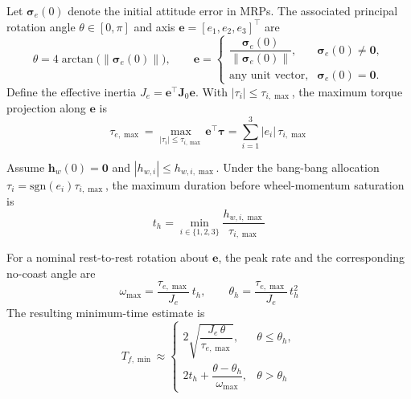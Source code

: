 \documentclass[journal]{new-aiaa}
\begin{document}
Let $\boldsymbol{\sigma}_e(0)$ denote the initial attitude error in MRPs. The associated principal rotation angle $\theta\in[0,\pi]$ and axis
$\boldsymbol{e}=[e_1,e_2,e_3]^\top$ are
\begin{equation}
\theta = 4\arctan\!\big(\|\boldsymbol{\sigma}_e(0)\|\big),\qquad
\boldsymbol{e} =
\begin{cases}
\dfrac{\boldsymbol{\sigma}_e(0)}{\|\boldsymbol{\sigma}_e(0)\|}, & \boldsymbol{\sigma}_e(0)\neq \boldsymbol{0},\\[6pt]
\text{any unit vector}, & \boldsymbol{\sigma}_e(0)=\boldsymbol{0}.
\end{cases}
\label{eq:app_axis_angle}
\end{equation}
Define the effective inertia $J_e = \boldsymbol{e}^\top\boldsymbol{J}_0\boldsymbol{e}$. With $|\tau_i|\le \tau_{i,\max}$, the maximum torque projection along $\boldsymbol{e}$ is
\begin{equation}
\tau_{e,\max}=\max_{|\tau_i|\le \tau_{i,\max}} \boldsymbol{e}^\top\boldsymbol{\tau}
=\sum_{i=1}^{3} |e_i|\,\tau_{i,\max}
\label{eq:app_tau_emax}
\end{equation}

Assume $\boldsymbol{h}_w(0)=\boldsymbol{0}$ and $|h_{w,i}|\le h_{w,i,\max}$. Under the bang-bang allocation $\tau_i=\mathrm{sgn}(e_i)\tau_{i,\max}$, the maximum duration before wheel-momentum saturation is
\begin{equation}
t_h = \min_{i\in\{1,2,3\}} \frac{h_{w,i,\max}}{\tau_{i,\max}}
\label{eq:app_th}
\end{equation}

For a nominal rest-to-rest rotation about $\boldsymbol{e}$, the peak rate and the corresponding no-coast angle are
\begin{equation}
\omega_{\max}=\frac{\tau_{e,\max}}{J_e}\,t_h,\qquad
\theta_h=\frac{\tau_{e,\max}}{J_e}\,t_h^2
\label{eq:app_omega_theta_h}
\end{equation}
The resulting minimum-time estimate is
\begin{equation}
T_{f,\min}\approx
\begin{cases}
2\sqrt{\dfrac{J_e\,\theta}{\tau_{e,\max}}}, & \theta \le \theta_h,\\[10pt]
2t_h+\dfrac{\theta-\theta_h}{\omega_{\max}}, & \theta > \theta_h
\end{cases}
\label{eq:app_Tmin_piecewise}
\end{equation}
\end{document}
